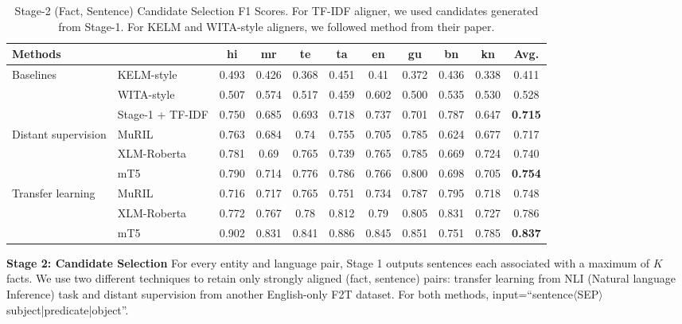 \documentclass[11pt]{article}
\begin{document}
\begin{table*}
    \centering
    \scriptsize
    \begin{tabular}{|p{0.6in}|l|c|c|c|c|c|c|c|c||c|}
    \hline
    Methods&&hi&mr&te&ta&en&gu&bn&kn&Avg.\\
    \hline
    \hline
    \multirow{3}{0.6in}{Baselines}&KELM-style~\cite{agarwal2021knowledge}&0.493&0.426&0.368&0.451&0.41&0.372&0.436&0.338&0.411\\
    \cline{2-11}
    &WITA-style~\cite{fu2020partially}&0.507&0.574&0.517&0.459&0.602&0.500&0.535&0.530&0.528\\
    \cline{2-11}
    &Stage-1 + TF-IDF&0.750&0.685&0.693&0.718&0.737&0.701&0.787&0.647&\textbf{0.715}\\
    \hline
    \hline
    \multirow{3}{0.6in}{Distant supervision}&MuRIL~\cite{khanuja2021muril}&0.763&0.684&0.74&0.755&0.705&0.785&0.624&0.677&0.717 \\
    \cline{2-11}
    &XLM-Roberta~\cite{conneau2020unsupervised}&0.781&0.69&0.765&0.739&0.765&0.785&0.669&0.724&0.740 \\
    \cline{2-11}
    &mT5~\cite{xue2021mt5}&0.790&0.714&0.776&0.786&0.766&0.800&0.698&0.705&\textbf{0.754}\\
    \hline
    \hline
    \multirow{3}{0.6in}{Transfer learning}&MuRIL~\cite{khanuja2021muril}&0.716&0.717&0.765&0.751&0.734&0.787&0.795&0.718&0.748 \\
    \cline{2-11}
    &XLM-Roberta~\cite{conneau2020unsupervised}&0.772&0.767&0.78&0.812&0.79&0.805&0.831&0.727&0.786 \\
    \cline{2-11}
    &mT5~\cite{xue2021mt5}&0.902&0.831&0.841&0.886&0.845&0.851&0.751&0.785&\textbf{0.837} \\
    \hline
    \end{tabular}
    \caption{Stage-2 (Fact, Sentence) Candidate Selection F1 Scores. For TF-IDF aligner, we used candidates generated from Stage-1. For KELM and WITA-style aligners, we followed method from their paper.}
    \label{tab:stage2Results}
\end{table*}

\noindent\textbf{Stage 2: Candidate Selection}
For every entity and language pair, Stage 1 outputs sentences each associated with a maximum of $K$ facts. We use two different techniques to retain only strongly aligned (fact, sentence) pairs: transfer learning from NLI (Natural language Inference) task and distant supervision from another English-only F2T dataset. For both methods, input=``sentence$\langle$SEP$\rangle$subject|predicate|object''.
\end{document}
